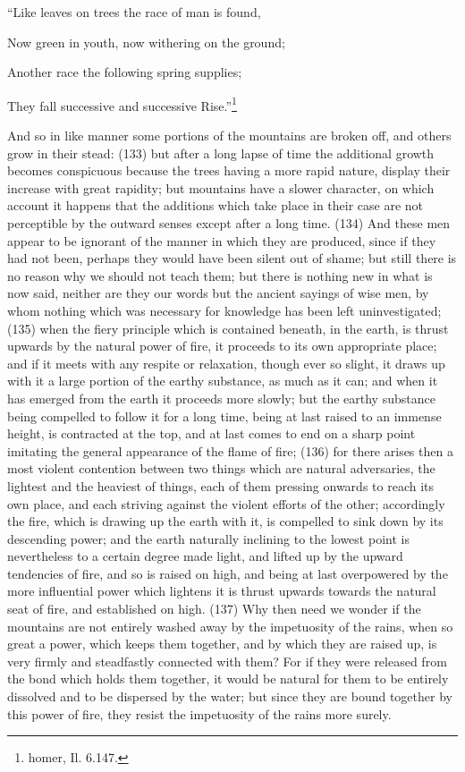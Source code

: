 ``Like leaves on trees the race of man is found,

Now green in youth, now withering on the ground;

Another race the following spring supplies;

They fall successive and successive Rise.''\footnote{homer, Il. 6.147.}

And so in like manner some portions of the mountains are broken off, and others grow in their
stead: (133) but after a long lapse of time the additional growth becomes conspicuous because the
trees having a more rapid nature, display their increase with great rapidity; but mountains have a
slower character, on which account it happens that the additions which take place in their case are
not perceptible by the outward senses except after a long time. (134) And these men appear to be
ignorant of the manner in which they are produced, since if they had not been, perhaps they would
have been silent out of shame; but still there is no reason why we should not teach them; but there
is nothing new in what is now said, neither are they our words but the ancient sayings of wise men,
by whom nothing which was necessary for knowledge has been left uninvestigated; (135) when the
fiery principle which is contained beneath, in the earth, is thrust upwards by the natural power of
fire, it proceeds to its own appropriate place; and if it meets with any respite or relaxation, though
ever so slight, it draws up with it a large portion of the earthy substance, as much as it can; and
when it has emerged from the earth it proceeds more slowly; but the earthy substance being
compelled to follow it for a long time, being at last raised to an immense height, is contracted at the
top, and at last comes to end on a sharp point imitating the general appearance of the flame of fire;
(136) for there arises then a most violent contention between two things which are natural
adversaries, the lightest and the heaviest of things, each of them pressing onwards to reach its
own place, and each striving against the violent efforts of the other; accordingly the fire, which is
drawing up the earth with it, is compelled to sink down by its descending power; and the earth
naturally inclining to the lowest point is nevertheless to a certain degree made light, and lifted up by
the upward tendencies of fire, and so is raised on high, and being at last overpowered by the more
influential power which lightens it is thrust upwards towards the natural seat of fire, and established
on high. (137) Why then need we wonder if the mountains are not entirely washed away by the
impetuosity of the rains, when so great a power, which keeps them together, and by which they are
raised up, is very firmly and steadfastly connected with them? For if they were released from the
bond which holds them together, it would be natural for them to be entirely dissolved and to be
dispersed by the water; but since they are bound together by this power of fire, they resist the
impetuosity of the rains more surely.

